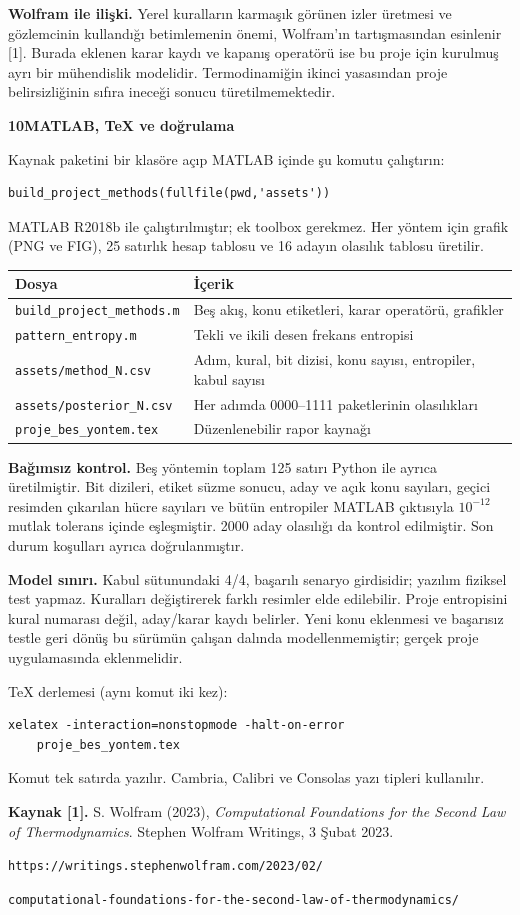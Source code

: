 \documentclass[11pt,a4paper]{article}
\newcommand{\heading}[2]{{\sffamily\small\color{blue!40!black}#1}\par{\sffamily\LARGE\bfseries#2}\par\vspace{3mm}}
\newcommand{\page}[2]{\newpage\heading{#1}{#2}}
\begin{document}
\textbf{Wolfram ile ilişki.} Yerel kuralların karmaşık görünen izler üretmesi
ve gözlemcinin kullandığı betimlemenin önemi, Wolfram'ın tartışmasından
esinlenir [1]. Burada eklenen karar kaydı ve kapanış operatörü ise bu proje
için kurulmuş ayrı bir mühendislik modelidir. Termodinamiğin ikinci yasasından
proje belirsizliğinin sıfıra ineceği sonucu türetilmemektedir.

\page{Kaynaklar ve yeniden üretim}{10\quad MATLAB, TeX ve doğrulama}
Kaynak paketini bir klasöre açıp MATLAB içinde şu komutu çalıştırın:
\begin{verbatim}
build_project_methods(fullfile(pwd,'assets'))
\end{verbatim}
MATLAB R2018b ile çalıştırılmıştır; ek toolbox gerekmez. Her yöntem için
grafik (PNG ve FIG), 25 satırlık hesap tablosu ve 16 adayın olasılık tablosu üretilir.
\begin{center}\small\begin{tabular}{p{64mm}p{85mm}}\toprule
Dosya & İçerik\\\midrule
\texttt{build\_project\_methods.m} & Beş akış, konu etiketleri, karar operatörü, grafikler\\
\texttt{pattern\_entropy.m} & Tekli ve ikili desen frekans entropisi\\
\texttt{assets/method\_N.csv} & Adım, kural, bit dizisi, konu sayısı, entropiler, kabul sayısı\\
\texttt{assets/posterior\_N.csv} & Her adımda 0000--1111 paketlerinin olasılıkları\\
\texttt{proje\_bes\_yontem.tex} & Düzenlenebilir rapor kaynağı\\\bottomrule
\end{tabular}\end{center}
\textbf{Bağımsız kontrol.} Beş yöntemin toplam 125 satırı Python ile ayrıca
üretilmiştir. Bit dizileri, etiket süzme sonucu, aday ve açık konu sayıları,
geçici resimden çıkarılan hücre sayıları ve bütün entropiler MATLAB çıktısıyla
$10^{-12}$ mutlak tolerans içinde eşleşmiştir. 2000 aday olasılığı da kontrol
edilmiştir. Son durum koşulları ayrıca doğrulanmıştır.

\textbf{Model sınırı.} Kabul sütunundaki 4/4, başarılı senaryo girdisidir;
yazılım fiziksel test yapmaz. Kuralları değiştirerek farklı resimler elde
edilebilir. Proje entropisini kural numarası değil, aday/karar kaydı belirler.
Yeni konu eklenmesi ve başarısız testle geri dönüş bu sürümün çalışan dalında
modellenmemiştir; gerçek proje uygulamasında eklenmelidir.

TeX derlemesi (aynı komut iki kez):
\begin{verbatim}
xelatex -interaction=nonstopmode -halt-on-error
    proje_bes_yontem.tex
\end{verbatim}
Komut tek satırda yazılır. Cambria, Calibri ve Consolas yazı tipleri kullanılır.

\textbf{Kaynak [1].} S. Wolfram (2023), \emph{Computational Foundations for
the Second Law of Thermodynamics}. Stephen Wolfram Writings, 3 Şubat 2023.
\par\small\texttt{https://writings.stephenwolfram.com/2023/02/}\par
\texttt{computational-foundations-for-the-second-law-of-thermodynamics/}
\end{document}
